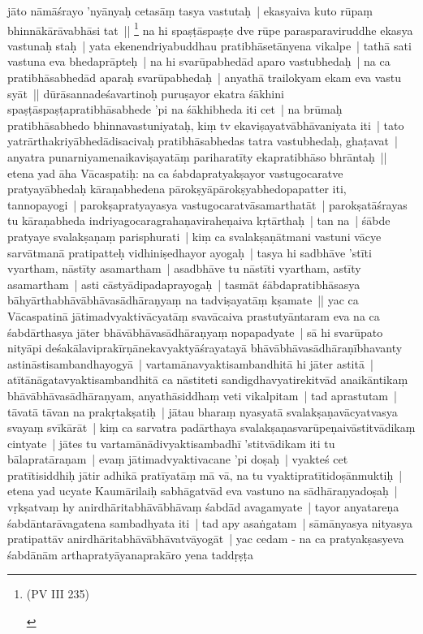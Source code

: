 \documentclass[article,a4paper]{memoir}
\begin{document}
	  \pstart jā\-to nā\-mā\-śrayo 'nyā\-nyaḥ cetasā\-ṃ tasya vastutaḥ | ekasyaiva kuto rū\-paṃ bhinnā\-kā\-rā\-vabhā\-si tat || \footnote{\begin{english}(PV III 235)\end{english}} \label{thakur75-60.29} na hi spaṣṭā\-spaṣṭe dve rū\-pe parasparaviruddhe ekasya vastunaḥ staḥ | yata ekenendriyabuddhau pratibhā\-setā\-nyena vikalpe | tathā\- sati vastuna eva bhedaprā\-pteḥ | na hi svarū\-pabhedā\-d aparo vastubhedaḥ | na ca pratibhā\-sabhedā\-d aparaḥ svarū\-pabhedaḥ | anyathā\- trailokyam ekam eva vastu syā\-t || \label{thakur75-61.3} dū\-rā\-sannadeśavartinoḥ puruṣayor ekatra śā\-khini spaṣṭā\-spaṣṭapratibhā\-sabhede 'pi na śā\-khibheda iti cet | na brū\-maḥ pratibhā\-sabhedo bhinnavastuniyataḥ, kiṃ tv ekaviṣayatvā\-bhā\-vaniyata iti | tato yatrā\-rthakriyā\-bhedā\-disacivaḥ pratibhā\-sabhedas tatra vastubhedaḥ, ghaṭavat | anyatra punarniyamenaikaviṣayatā\-ṃ pariharatī\-ty ekapratibhā\-so bhrā\-ntaḥ || \label{thakur75-61.7} etena yad ā\-ha Vā\-caspatiḥ: na ca śabdapratyakṣayor vastugocaratve pratyayā\-bhedaḥ kā\-raṇabhedena pā\-rokṣyā\-pā\-rokṣyabhedopapatter iti, tannopayogi | parokṣapratyayasya vastugocaratvā\-samarthatā\-t | parokṣatā\-śrayas tu kā\-raṇabheda indriyagocaragrahaṇaviraheṇaiva kṛtā\-rthaḥ | tan na | śā\-bde pratyaye svalakṣaṇaṃ parisphurati | kiṃ ca svalakṣaṇā\-tmani vastuni vā\-cye sarvā\-tmanā\- pratipatteḥ vidhiniṣedhayor ayogaḥ | tasya hi sadbhā\-ve 'stī\-ti vyartham, nā\-stī\-ty asamartham | asadbhā\-ve tu nā\-stī\-ti vyartham, astī\-ty asamartham | asti cā\-styā\-dipadaprayogaḥ | tasmā\-t śā\-bdapratibhā\-sasya bā\-hyā\-rthabhā\-vā\-bhā\-vasā\-dhā\-raṇyaṃ na tadviṣayatā\-ṃ kṣamate || \label{thakur75-61.15} yac ca Vā\-caspatinā\- jā\-timadvyaktivā\-cyatā\-ṃ svavā\-caiva prastutyā\-ntaram eva na ca śabdā\-rthasya jā\-ter bhā\-vā\-bhā\-vasā\-dhā\-raṇyaṃ nopapadyate | sā\- hi svarū\-pato nityā\-pi deśakā\-laviprakī\-rṇā\-nekavyaktyā\-śrayatayā\- bhā\-vā\-bhā\-vasā\-dhā\-raṇī\-bhavanty astinā\-stisambandhayogyā\- | vartamā\-navyaktisambandhitā\- hi jā\-ter astitā\- | atī\-tā\-nā\-gatavyaktisambandhitā\- ca nā\-stiteti sandigdhavyatirekitvā\-d anaikā\-ntikaṃ bhā\-vā\-bhā\-vasā\-dhā\-raṇyam, anyathā\-siddhaṃ veti vikalpitam | tad aprastutam | tā\-vatā\- tā\-van na prakṛtakṣatiḥ | jā\-tau bharaṃ nyasyatā\- svalakṣaṇavā\-cyatvasya svayaṃ svī\-kā\-rā\-t | kiṃ ca sarvatra padā\-rthaya svalakṣaṇasvarū\-peṇaivā\-stitvā\-dikaṃ cintyate | jā\-tes tu vartamā\-nā\-divyaktisambadhī\- 'stitvā\-dikam iti tu bā\-lapratā\-raṇam | evaṃ jā\-timadvyaktivacane 'pi doṣaḥ | vyakteś cet pratī\-tisiddhiḥ jā\-tir adhikā\- pratī\-yatā\-ṃ mā\- vā\-, na tu vyaktipratī\-tidoṣā\-nmuktiḥ | \label{thakur75-61.25} etena yad ucyate Kaumā\-rilaiḥ sabhā\-gatvā\-d eva vastuno na sā\-dhā\-raṇyadoṣaḥ | vṛkṣatvaṃ hy anirdhā\-ritabhā\-vā\-bhā\-vaṃ śabdā\-d avagamyate | tayor anyatareṇa śabdā\-ntarā\-vagatena sambadhyata iti | tad apy asaṅgatam | sā\-mā\-nyasya nityasya pratipattā\-v anirdhā\-ritabhā\-vā\-bhā\-vatvā\-yogā\-t | \label{thakur75-62.1} yac cedam - na ca pratyakṣasyeva śabdā\-nā\-m arthapratyā\-yanaprakā\-ro yena taddṛṣṭa 
\end{document}
